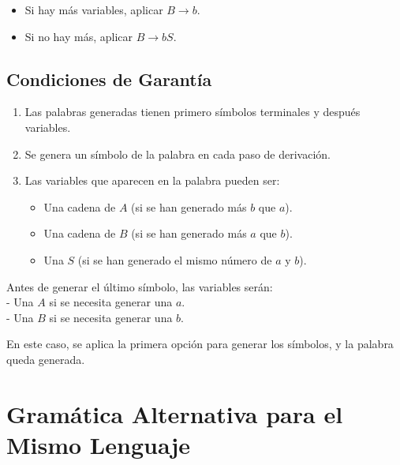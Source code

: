 \documentclass[12pt]{report} %
\providecommand{\tightlist}{%
  \setlength{\itemsep}{0pt}\setlength{\parskip}{0pt}}
\begin{document}
\begin{itemize}
\begin{itemize}
\begin{itemize}
      \begin{itemize}
      \tightlist
      \item
        Si hay más variables, aplicar \(B \to b\).\\
      \item
        Si no hay más, aplicar \(B \to bS\).
      \end{itemize}
    \end{itemize}
  \end{itemize}
\end{itemize}

\hypertarget{condiciones-de-garantuxeda}{%
\subsection{Condiciones de Garantía}\label{condiciones-de-garantuxeda}}

\begin{enumerate}
\def\labelenumi{\arabic{enumi}.}
\tightlist
\item
  Las palabras generadas tienen primero símbolos terminales y después
  variables.\\
\item
  Se genera un símbolo de la palabra en cada paso de derivación.\\
\item
  Las variables que aparecen en la palabra pueden ser:

  \begin{itemize}
  \tightlist
  \item
    Una cadena de \(A\) (si se han generado más \(b\) que \(a\)).\\
  \item
    Una cadena de \(B\) (si se han generado más \(a\) que \(b\)).\\
  \item
    Una \(S\) (si se han generado el mismo número de \(a\) y \(b\)).
  \end{itemize}
\end{enumerate}

Antes de generar el último símbolo, las variables serán:\\
- Una \(A\) si se necesita generar una \(a\).\\
- Una \(B\) si se necesita generar una \(b\).

En este caso, se aplica la primera opción para generar los símbolos, y
la palabra queda generada.

\hypertarget{gramuxe1tica-alternativa-para-el-mismo-lenguaje}{%
\section{Gramática Alternativa para el Mismo
Lenguaje}\label{gramuxe1tica-alternativa-para-el-mismo-lenguaje}}
\end{document}
